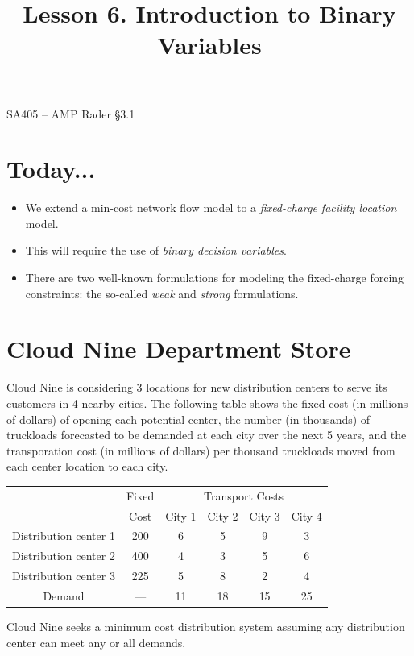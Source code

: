 \documentclass[11pt]{article}
\makeatletter
\theoremstyle{definition}
\renewcommand{\maketitle}{
  \noindent SA405 -- AMP \hfill Rader \S 3.1 \\

  \begin{center}\Large{\textbf{\@title}}\end{center}
}
\makeatother
\begin{document}
  
\title{Lesson 6.  Introduction to Binary Variables}

\maketitle

\section{Today...}

\begin{itemize}
	\item  We extend a min-cost network flow model to a \emph{fixed-charge facility location} model.
	\item  This will require the use of \emph{binary decision variables}.
	\item  There are two well-known formulations for modeling the fixed-charge forcing constraints:  the so-called \emph{weak} and \emph{strong} formulations.
\end{itemize}

\section{Cloud Nine Department Store}
Cloud Nine is considering 3 locations for new distribution centers to serve its customers in 4 nearby cities.  The following table shows the fixed cost (in millions of dollars) of opening each potential center, the number (in thousands) of truckloads forecasted to be demanded at each city over the next 5 years, and the transporation cost (in millions of dollars) per thousand truckloads moved from each center location to each city.  

\begin{center}
\begin{tabular}{c|c|cccc}
& Fixed & \multicolumn{4}{c}{Transport Costs} \\
& Cost & City 1 & City 2 & City 3 & City 4\\
\hline
Distribution center 1 & 200 & 6 & 5 & 9 & 3  \\
Distribution center 2 & 400 & 4 & 3 & 5 & 6 \\
Distribution center 3 & 225 & 5 & 8 & 2 & 4 \\
\hline
Demand & --- & 11 & 18 & 15 & 25
\end{tabular}
\end{center}

Cloud Nine seeks a minimum cost distribution system assuming any distribution center can meet any or all demands.
\end{document}
